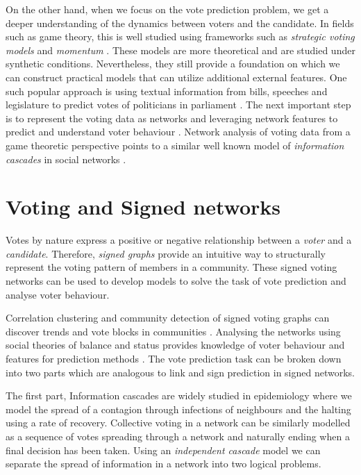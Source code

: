 On the other hand, when we focus on the vote prediction problem, we get a deeper understanding of the dynamics between voters and the candidate. In fields such as game theory, this is well studied using frameworks such as \textit{strategic voting models} and \textit{momentum} \cite{meir2020strategic,zou2015strategicDoodle,ali2006a,banerjee1992simple}. These models are more theoretical and are studied under synthetic conditions. Nevertheless, they still provide a foundation on which we can construct practical models that can utilize additional external features. One such popular approach is using textual information from bills, speeches and legislature to predict votes of politicians in parliament \cite{budhwar2018predicting,gerrish2011predicting}. The next important step is to represent the voting data as networks and leveraging network features to predict and understand voter behaviour \cite{tal2015a,brito2020aBrazil,kearns2009behavioral,derr2018congressional,arinik2017signed}. Network analysis of voting data from a game theoretic perspective points to a similar well known model of \textit{information cascades} in social networks \cite{ali2006theory}.

\section{Voting and Signed networks}
Votes by nature express a positive or negative relationship between a \textit{voter} and a \textit{candidate}. Therefore, \textit{signed graphs} provide an intuitive way to structurally represent the voting pattern of members in a community. These signed voting networks can be used to develop models to solve the task of vote prediction and analyse voter behaviour.

Correlation clustering and community detection of signed voting graphs can discover trends and vote blocks in communities \cite{brito2020aBrazil,arinik2017signed}. Analysing the networks using social theories of balance and status provides knowledge of voter behaviour and features for prediction methods \cite{levorato2016brazilian,derr2018congressional}. The vote prediction task can be broken down into two parts which are analogous to link and sign prediction in signed networks. 

The first part, 
\iffalse
{}
Information cascades are widely studied in epidemiology where we model the spread of a contagion through infections of neighbours and the halting using a rate of recovery. Collective voting in a network can be similarly modelled as a sequence of votes spreading through a network and naturally ending when a final decision has been taken. Using an \textit{independent cascade} model we can separate the spread of information in a network into two logical problems.


